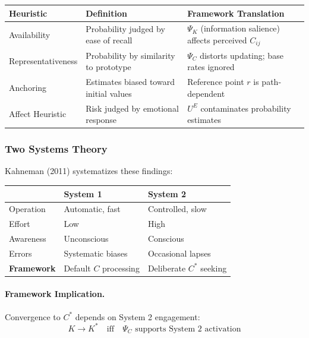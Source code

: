 \begin{center}
\renewcommand{\arraystretch}{1.4}
\small
\begin{tabular}{|p{2.5cm}|p{4cm}|p{5cm}|}
\hline
\textbf{Heuristic} & \textbf{Definition} & \textbf{Framework Translation} \\
\hline
Availability & Probability judged by ease of recall & $\Psi_K$ (information salience) affects perceived $C_{ij}$ \\
\hline
Representativeness & Probability by similarity to prototype & $\Psi_C$ distorts updating; base rates ignored \\
\hline
Anchoring & Estimates biased toward initial values & Reference point $r$ is path-dependent \\
\hline
Affect Heuristic & Risk judged by emotional response & $U^E$ contaminates probability estimates \\
\hline
\end{tabular}
\end{center}

\subsubsection{Two Systems Theory}

Kahneman (2011) systematizes these findings:

\begin{center}
\begin{tabular}{|l|l|l|}
\hline
& \textbf{System 1} & \textbf{System 2} \\
\hline
Operation & Automatic, fast & Controlled, slow \\
Effort & Low & High \\
Awareness & Unconscious & Conscious \\
Errors & Systematic biases & Occasional lapses \\
\hline
\textbf{Framework} & Default $C$ processing & Deliberate $C^*$ seeking \\
\hline
\end{tabular}
\end{center}

\paragraph{Framework Implication.}
Convergence to $C^*$ depends on System 2 engagement:
\begin{equation}
K \to K^* \quad \text{iff} \quad \Psi_C \text{ supports System 2 activation}
\end{equation}

